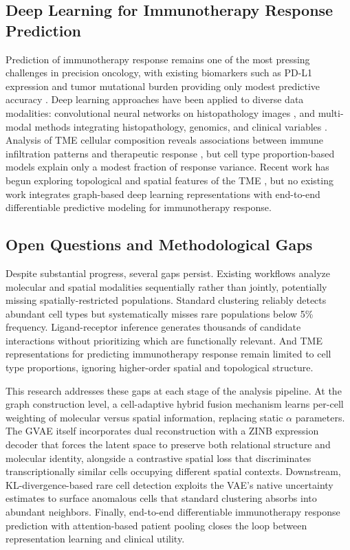 \documentclass{article}
\begin{document}
\subsection{Deep Learning for Immunotherapy Response Prediction}

Prediction of immunotherapy response remains one of the most pressing challenges in precision oncology, with existing biomarkers such as PD-L1 expression and tumor mutational burden providing only modest predictive accuracy \citep{jardim2021role}. Deep learning approaches have been applied to diverse data modalities: convolutional neural networks on histopathology images \citep{kather2019deep}, and multi-modal methods integrating histopathology, genomics, and clinical variables \citep{chen2020pathomic}. Analysis of TME cellular composition reveals associations between immune infiltration patterns and therapeutic response \citep{tumeh2014pd}, but cell type proportion-based models explain only a modest fraction of response variance. Recent work has begun exploring topological and spatial features of the TME \citep{keren2018structured}, but no existing work integrates graph-based deep learning representations with end-to-end differentiable predictive modeling for immunotherapy response.

\subsection{Open Questions and Methodological Gaps}

Despite substantial progress, several gaps persist. Existing workflows analyze molecular and spatial modalities sequentially rather than jointly, potentially missing spatially-restricted populations. Standard clustering reliably detects abundant cell types but systematically misses rare populations below 5\% frequency. Ligand-receptor inference generates thousands of candidate interactions without prioritizing which are functionally relevant. And TME representations for predicting immunotherapy response remain limited to cell type proportions, ignoring higher-order spatial and topological structure.

This research addresses these gaps at each stage of the analysis pipeline. At the graph construction level, a cell-adaptive hybrid fusion mechanism learns per-cell weighting of molecular versus spatial information, replacing static $\alpha$ parameters. The GVAE itself incorporates dual reconstruction with a ZINB expression decoder that forces the latent space to preserve both relational structure and molecular identity, alongside a contrastive spatial loss that discriminates transcriptionally similar cells occupying different spatial contexts. Downstream, KL-divergence-based rare cell detection exploits the VAE's native uncertainty estimates to surface anomalous cells that standard clustering absorbs into abundant neighbors. Finally, end-to-end differentiable immunotherapy response prediction with attention-based patient pooling closes the loop between representation learning and clinical utility.
\end{document}
